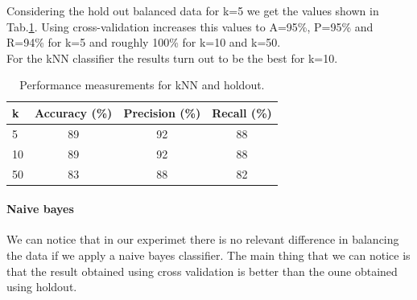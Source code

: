 \documentclass{article}
\begin{document}
Considering the hold out balanced data for k=5 we get the values shown in Tab.\ref{tab:perf_kNN_breast}. Using cross-validation increases this values to A=95\%, P=95\% and R=94\% for k=5 and roughly 100\% for k=10 and k=50. \\
For the kNN classifier the results turn out to be the best for k=10.

\begin{table}[h!]
		\centering
    \begin{tabular}{ l c c c }
        \toprule
        \textbf{k} & \textbf{Accuracy (\%)} & \textbf{Precision (\%)} & \textbf{Recall (\%)} \\
        \toprule
				5 & 89 & 92 & 88 \\
				10 & 89 & 92 & 88 \\
				50 & 83 & 88 & 82 \\
        \bottomrule
    \end{tabular}
		\caption{Performance measurements for kNN and holdout.}
		\label{tab:perf_kNN_breast}
\end{table}


\paragraph{Naive bayes}
We can notice that in our experimet there is no relevant difference in balancing the data if we apply a naive bayes classifier.
The main thing that we can notice is that the result obtained using cross validation is better than the oune obtained using holdout.
\end{document}
